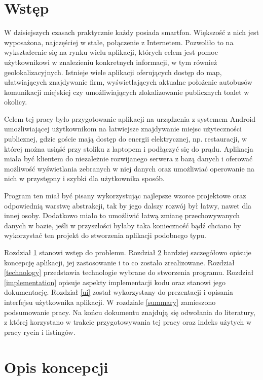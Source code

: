 \documentclass[polish,polish,a4paper,12pt]{article}
\let\sectioncmd\section
\renewcommand{\section}{\clearpage\sectioncmd}
\begin{document}
\tableofcontents

\pagestyle{plain}

\section{Wstęp}\label{preface}

W dzisiejszych czasach praktycznie każdy posiada smartfon. Większość z nich jest wyposażona, najczęściej w stałe, połączenie z Internetem. Pozwoliło to na wykształcenie się na rynku wielu aplikacji, których celem jest pomoc użytkownikowi w znalezieniu konkretnych informacji, w tym również geolokalizacyjnych. Istnieje wiele aplikacji oferujących dostęp do map, ułatwiających znajdywanie firm, wyświetlających aktualne położenie autobusów komunikacji miejskiej czy umożliwiających zlokalizowanie publicznych toalet w okolicy.

Celem tej pracy było przygotowanie aplikacji na urządzenia z systemem Android umożliwiającej użytkownikom na łatwiejsze znajdywanie miejsc użyteczności publicznej, gdzie goście mają dostęp do energii elektrycznej, np. restauracji, w której można usiąść przy stoliku z laptopem i podłączyć się do prądu. Aplikacja miała być klientem do niezależnie rozwijanego serwera z bazą danych i oferować możliwość wyświetlania zebranych w niej danych oraz umożliwiać operowanie na nich w przystępny i szybki dla użytkownika sposób.

Program ten miał być pisany wykorzystując najlepsze wzorce projektowe oraz odpowiednią warstwę abstrakcji, tak by jego dalszy rozwój był łatwy, nawet dla innej osoby. Dodatkowo miało to umożliwić łatwą zmianę przechowywanych danych w bazie, jeśli w przyszłości byłaby taka konieczność bądź chciano by wykorzystać ten projekt do stworzenia aplikacji podobnego typu.

Rozdział \ref{preface} stanowi wstęp do problemu. Rozdział \ref{concept} bardziej szczegółowo opisuje koncepcję aplikacji, jej zastosowanie i to co zostało zrealizowane. Rozdział \ref{technology} przedstawia technologie wybrane do stworzenia programu. Rozdział \ref{implementation} opisuje aspekty implementacji kodu oraz stanowi jego dokumentację. Rozdział \ref{ui} został wykorzystany do prezentacji i opisania interfejsu użytkownika aplikacji. W rozdziale \ref{summary} zamieszono podsumowanie pracy. Na końcu dokumentu znajdują się odwołania do literatury, z której korzystano w trakcie przygotowywania tej pracy oraz indeks użytych w pracy rycin i listingów.

\section{Opis koncepcji}\label{concept}
\end{document}
